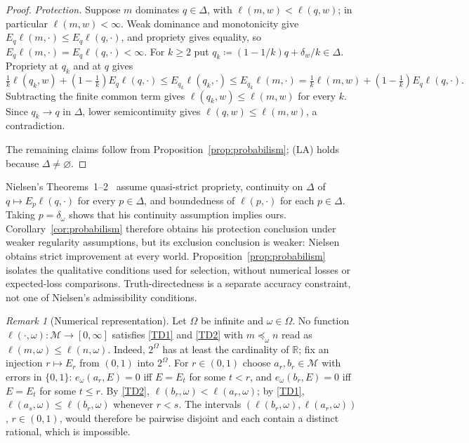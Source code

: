 \documentclass[11pt]{article}
\newenvironment{chgblockb}{\color{red}}{}
\theoremstyle{definition}
\theoremstyle{remark}
\newtheorem{remark}[theorem]{Remark}
\newcommand{\M}{\mathcal M}
\begin{document}
\begin{chgblockb}
\begin{proof}
\emph{Protection.} Suppose $m$ dominates $q\in\Delta$, with $\ell(m,w)<\ell(q,w)$; in particular $\ell(m,w)<\infty$. Weak dominance and monotonicity give $E_q\ell(m,\cdot)\le E_q\ell(q,\cdot)$, and propriety gives equality, so $E_q\ell(m,\cdot)=E_q\ell(q,\cdot)<\infty$. For $k\ge2$ put $q_k\coloneqq(1-1/k)q+\delta_w/k\in\Delta$. Propriety at $q_k$ and at $q$ gives
\[
\tfrac1k\ell(q_k,w)+(1-\tfrac1k)E_q\ell(q,\cdot)\le E_{q_k}\ell(q_k,\cdot)\le E_{q_k}\ell(m,\cdot)=\tfrac1k\ell(m,w)+(1-\tfrac1k)E_q\ell(q,\cdot).
\]
Subtracting the finite common term gives $\ell(q_k,w)\le\ell(m,w)$ for every $k$. Since $q_k\to q$ in $\Delta$, lower semicontinuity gives $\ell(q,w)\le\ell(m,w)$, a contradiction.

The remaining claims follow from Proposition~\ref{prop:probabilism}; (LA) holds because $\Delta\ne\varnothing$.
\end{proof}

Nielsen's Theorems~1--2~\cite{Nielsen2023} assume quasi-strict propriety, continuity on $\Delta$ of $q\mapsto E_p\ell(q,\cdot)$ for every $p\in\Delta$, and boundedness of $\ell(p,\cdot)$ for each $p\in\Delta$. Taking $p=\delta_\omega$ shows that his continuity assumption implies ours. Corollary~\ref{cor:probabilism} therefore obtains his protection conclusion under weaker regularity assumptions, but its exclusion conclusion is weaker: Nielsen obtains strict improvement at every world. Proposition~\ref{prop:probabilism} isolates the qualitative conditions used for selection, without numerical losses or expected-loss comparisons. Truth-directedness is a separate accuracy constraint, not one of Nielsen's admissibility conditions.

\begin{remark}[Numerical representation]\label{rem:numerical-TD}
Let $\Omega$ be infinite and $\omega\in\Omega$. No function $\ell(\cdot,\omega):\M\to[0,\infty]$ satisfies \ref{TD1} and \ref{TD2} with $m\preceq_\omega n$ read as $\ell(m,\omega)\le\ell(n,\omega)$. Indeed, $2^\Omega$ has at least the cardinality of $\mathbb R$; fix an injection $r\mapsto E_r$ from $(0,1)$ into $2^\Omega$. For $r\in(0,1)$ choose $a_r,b_r\in\M$ with errors in $\{0,1\}$: $e_\omega(a_r,E)=0$ iff $E=E_t$ for some $t<r$, and $e_\omega(b_r,E)=0$ iff $E=E_t$ for some $t\le r$. By \ref{TD2}, $\ell(b_r,\omega)<\ell(a_r,\omega)$; by \ref{TD1}, $\ell(a_s,\omega)\le\ell(b_r,\omega)$ whenever $r<s$. The intervals $(\ell(b_r,\omega),\ell(a_r,\omega))$, $r\in(0,1)$, would therefore be pairwise disjoint and each contain a distinct rational, which is impossible.


\end{remark}
\end{chgblockb}
\end{document}
